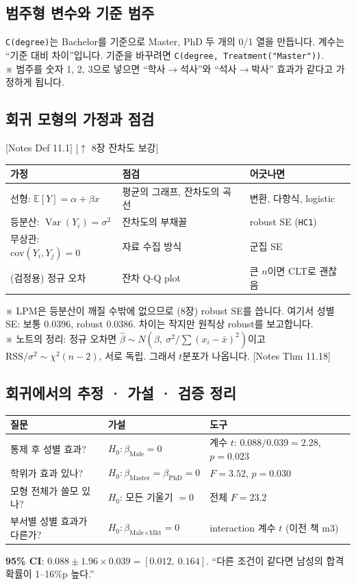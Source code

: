 \documentclass[11pt,a4paper]{article}
\newcommand{\E}{\mathbb{E}}
\newcommand{\Var}{\operatorname{Var}}
\newcommand{\code}[1]{\texttt{#1}}
\newcommand{\nref}[1]{{\footnotesize\textsf{\color{blue!55!black}[Notes #1]}}}
\newcommand{\aside}[1]{{\footnotesize\color{black!65}#1}}
\newcommand{\linkup}[1]{{\footnotesize\textsf{\color{green!40!black}[$\uparrow$ #1 보강]}}}
\begin{document}
\subsection{범주형 변수와 기준 범주}
\code{C(degree)}는 Bachelor를 기준으로 Master, PhD 두 개의 0/1 열을 만듭니다. 계수는 ``기준 대비 차이''입니다. 기준을 바꾸려면 \code{C(degree, Treatment("Master"))}.\\
\aside{※ 범주를 숫자 1, 2, 3으로 넣으면 ``학사$\to$석사''와 ``석사$\to$박사'' 효과가 같다고 가정하게 됩니다.}

\subsection{회귀 모형의 가정과 점검} \nref{Def 11.1} \linkup{8장 잔차도}
\begin{center}
\begin{tabular}{@{}p{4.2cm} p{4.6cm} p{5.2cm}@{}}
\toprule
가정 & 점검 & 어긋나면 \\
\midrule
선형: $\E[Y]=\alpha+\beta x$ & 평균의 그래프, 잔차도의 곡선 & 변환, 다항식, logistic \\
등분산: $\Var(Y_i)=\sigma^2$ & 잔차도의 부채꼴 & robust SE (\code{HC1}) \\
무상관: $\text{cov}(Y_i,Y_j)=0$ & 자료 수집 방식 & 군집 SE \\
(검정용) 정규 오차 & 잔차 Q-Q plot & 큰 $n$이면 CLT로 괜찮음 \\
\bottomrule
\end{tabular}
\end{center}
\aside{※ LPM은 등분산이 깨질 수밖에 없으므로 (8장) robust SE를 씁니다. 여기서 성별 SE: 보통 0.0396, robust 0.0386. 차이는 작지만 원칙상 robust를 보고합니다.}\\
\aside{※ 노트의 정리: 정규 오차면 $\hat\beta\sim N(\beta,\ \sigma^2/\sum(x_i-\bar x)^2)$이고 $\text{RSS}/\sigma^2\sim\chi^2(n-2)$, 서로 독립. 그래서 $t$분포가 나옵니다. \nref{Thm 11.18}}

\subsection{회귀에서의 추정 · 가설 · 검증 정리}
\begin{center}
\begin{tabular}{@{}p{3.6cm} p{4.8cm} p{5.6cm}@{}}
\toprule
질문 & 가설 & 도구 \\
\midrule
통제 후 성별 효과? & $H_0:\beta_{\text{Male}}=0$ & 계수 $t$: $0.088/0.039=2.28$, $p=0.023$ \\
학위가 효과 있나? & $H_0:\beta_{\text{Master}}=\beta_{\text{PhD}}=0$ & $F=3.52$, $p=0.030$ \\
모형 전체가 쓸모 있나? & $H_0$: 모든 기울기 $=0$ & 전체 $F=23.2$ \\
부서별 성별 효과가 다른가? & $H_0:\beta_{\text{Male}\times\text{Mkt}}=0$ & interaction 계수 $t$ (이전 책 m3) \\
\bottomrule
\end{tabular}
\end{center}
\textbf{95\% CI}: $0.088\pm1.96\times0.039=[0.012,\ 0.164]$. ``다른 조건이 같다면 남성의 합격 확률이 1–16\%p 높다.''
\end{document}
